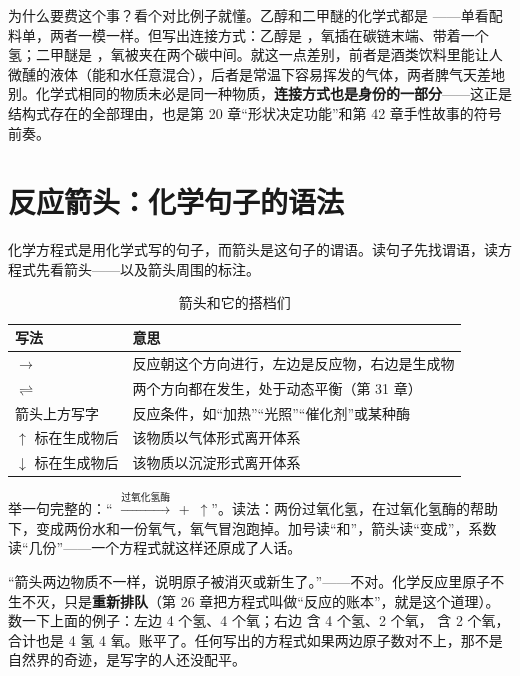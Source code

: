 为什么要费这个事？看个对比例子就懂。乙醇和二甲醚的化学式都是 ——单看配料单，两者一模一样。但写出连接方式：乙醇是 ，氧插在碳链末端、带着一个氢；二甲醚是 ，氧被夹在两个碳中间。就这一点差别，前者是酒类饮料里能让人微醺的液体（能和水任意混合），后者是常温下容易挥发的气体，两者脾气天差地别。化学式相同的物质未必是同一种物质，\textbf{连接方式也是身份的一部分}——这正是结构式存在的全部理由，也是第 20 章“形状决定功能”和第 42 章手性故事的符号前奏。

\section{反应箭头：化学句子的语法}

化学方程式是用化学式写的句子，而箭头是这句子的谓语。读句子先找谓语，读方程式先看箭头——以及箭头周围的标注。

\begin{table}[htbp]
\centering
\caption{箭头和它的搭档们}
\begin{tabular}{ll}
\toprule
写法 & 意思 \\
\midrule
$\rightarrow$ & 反应朝这个方向进行，左边是反应物，右边是生成物 \\
$\rightleftharpoons$ & 两个方向都在发生，处于动态平衡（第 31 章） \\
箭头上方写字 & 反应条件，如“加热”“光照”“催化剂”或某种酶 \\
$\uparrow$ 标在生成物后 & 该物质以气体形式离开体系 \\
$\downarrow$ 标在生成物后 & 该物质以沉淀形式离开体系 \\
\bottomrule
\end{tabular}
\end{table}

举一句完整的：“ $\xrightarrow{\text{过氧化氢酶}}$  + \,$\uparrow$”。读法：两份过氧化氢，在过氧化氢酶的帮助下，变成两份水和一份氧气，氧气冒泡跑掉。加号读“和”，箭头读“变成”，系数读“几份”——一个方程式就这样还原成了人话。

\begin{wuqu}
“箭头两边物质不一样，说明原子被消灭或新生了。”——不对。化学反应里原子不生不灭，只是\textbf{重新排队}（第 26 章把方程式叫做“反应的账本”，就是这个道理）。数一下上面的例子：左边 4 个氢、4 个氧；右边  含 4 个氢、2 个氧， 含 2 个氧，合计也是 4 氢 4 氧。账平了。任何写出的方程式如果两边原子数对不上，那不是自然界的奇迹，是写字的人还没配平。
\end{wuqu}

